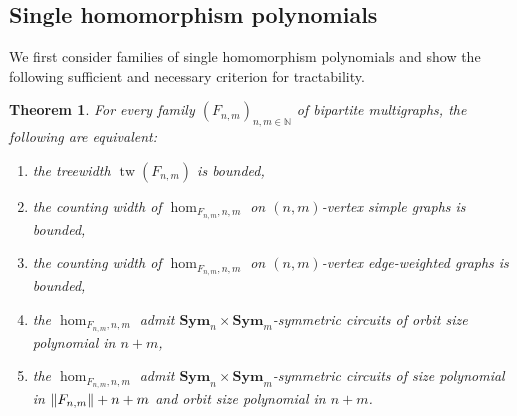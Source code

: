 \documentclass[10pt,a4paper]{article}
\theoremstyle{definition}
\theoremstyle{plain}
\newtheorem{theorem}[definition]{Theorem}
\theoremstyle{remark}
\DeclarePairedDelimiter{\norm}{\lVert}{\rVert}
\DeclareMathOperator{\tw}{tw}
\newcommand{\Sym}{\mathbf{Sym}}
\begin{document}
%		
%		
%	
	
	
\subsection{Single homomorphism polynomials}

	We first consider families of single homomorphism polynomials and show the following sufficient and necessary criterion for tractability.

\begin{theorem}
	\label{thm:dichotomy-chromatic}
	For every family  $(F_{n,m})_{n,m \in \mathbb{N}}$ of bipartite multigraphs,
	the following are equivalent:
	\begin{enumerate}
		\item the treewidth $\tw(F_{n,m})$ is bounded,\label{it:hom1}
		\item the counting width of $\hom_{F_{n,m},n,m}$ on $(n,m)$-vertex simple graphs is bounded,\label{it:hom2}
		\item the counting width of $\hom_{F_{n,m},n,m}$ on $(n,m)$-vertex edge-weighted graphs is bounded,\label{it:hom3}
		\item the $\hom_{F_{n,m}, n, m}$ admit $\Sym_n \times \Sym_m$-symmetric circuits of orbit size polynomial in $n+m$,\label{it:hom5}
		\item the $\hom_{F_{n,m}, n, m}$ admit $\Sym_n \times \Sym_m$-symmetric circuits of size polynomial in $\norm{F_{n,m}} + n +m$ and orbit size polynomial in $n+m$.\label{it:hom4}
	\end{enumerate}
\end{theorem}
\end{document}
